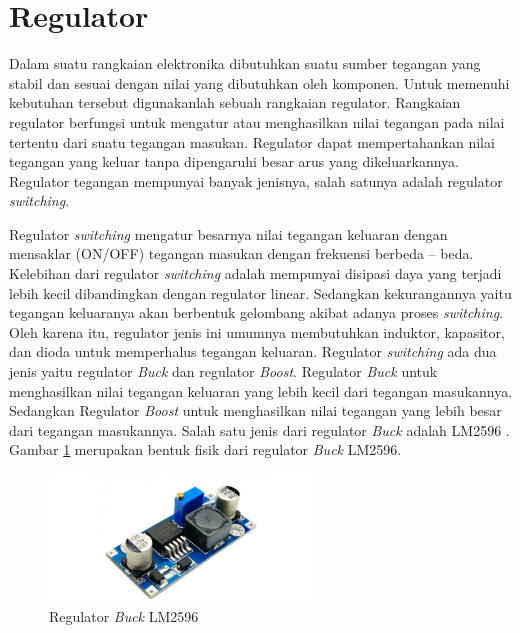 \section{Regulator}
Dalam suatu rangkaian elektronika dibutuhkan suatu sumber tegangan yang stabil dan sesuai dengan nilai yang dibutuhkan oleh komponen. Untuk memenuhi kebutuhan tersebut digunakanlah sebuah rangkaian regulator. Rangkaian regulator berfungsi untuk mengatur atau menghasilkan nilai tegangan pada nilai tertentu dari suatu tegangan masukan. Regulator dapat mempertahankan nilai tegangan yang keluar tanpa dipengaruhi besar arus yang dikeluarkannya. Regulator tegangan mempunyai banyak jenisnya, salah satunya adalah regulator \textit{switching}\cite{sitohang2018}.

Regulator \textit{switching} mengatur besarnya nilai tegangan keluaran dengan mensaklar (ON/OFF) tegangan masukan dengan frekuensi berbeda – beda. Kelebihan dari regulator \textit{switching} adalah mempunyai disipasi daya yang terjadi lebih kecil dibandingkan dengan regulator linear. Sedangkan kekurangannya yaitu tegangan keluaranya akan berbentuk gelombang akibat adanya proses \textit{switching}. Oleh karena itu, regulator jenis ini umumnya membutuhkan induktor, kapasitor, dan dioda untuk memperhalus tegangan keluaran. Regulator \textit{switching} ada dua jenis yaitu regulator \textit{Buck} dan regulator \textit{Boost}. Regulator \textit{Buck} untuk menghasilkan nilai tegangan keluaran yang lebih kecil dari tegangan masukannya. Sedangkan Regulator \textit{Boost} untuk menghasilkan nilai tegangan yang lebih besar dari tegangan masukannya. Salah satu jenis dari regulator \textit{Buck} adalah LM2596 . Gambar \ref{pic.lm2596} merupakan bentuk fisik dari regulator \textit{Buck} LM2596\cite{semiconductor2008}.

	\begin{figure}[H]
	\centering
	\includegraphics[width=7cm]{gambar/lm2596.jpg}
	\caption{Regulator \textit{Buck} LM2596\cite{Minikits}}
	\label{pic.lm2596}
\end{figure}

